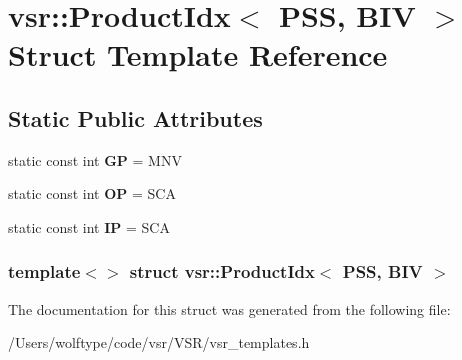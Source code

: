 \hypertarget{structvsr_1_1_product_idx_3_01_p_s_s_00_01_b_i_v_01_4}{\section{vsr\-:\-:Product\-Idx$<$ P\-S\-S, B\-I\-V $>$ Struct Template Reference}
\label{structvsr_1_1_product_idx_3_01_p_s_s_00_01_b_i_v_01_4}
}
\subsection*{Static Public Attributes}
\begin{DoxyCompactItemize}
\item 
\hypertarget{structvsr_1_1_product_idx_3_01_p_s_s_00_01_b_i_v_01_4_a77a0aca22c01c6dbe3514587b70cdd86}{static const int {\bfseries G\-P} = M\-N\-V}\label{structvsr_1_1_product_idx_3_01_p_s_s_00_01_b_i_v_01_4_a77a0aca22c01c6dbe3514587b70cdd86}

\item 
\hypertarget{structvsr_1_1_product_idx_3_01_p_s_s_00_01_b_i_v_01_4_a82cf21270ec0d18e4947c6366a3e0d1e}{static const int {\bfseries O\-P} = S\-C\-A}\label{structvsr_1_1_product_idx_3_01_p_s_s_00_01_b_i_v_01_4_a82cf21270ec0d18e4947c6366a3e0d1e}

\item 
\hypertarget{structvsr_1_1_product_idx_3_01_p_s_s_00_01_b_i_v_01_4_a86f6d55646073d437173d5deec8e667f}{static const int {\bfseries I\-P} = S\-C\-A}\label{structvsr_1_1_product_idx_3_01_p_s_s_00_01_b_i_v_01_4_a86f6d55646073d437173d5deec8e667f}

\end{DoxyCompactItemize}
\subsubsection*{template$<$$>$ struct vsr\-::\-Product\-Idx$<$ P\-S\-S, B\-I\-V $>$}



The documentation for this struct was generated from the following file\-:\begin{DoxyCompactItemize}
\item 
/\-Users/wolftype/code/vsr/\-V\-S\-R/vsr\-\_\-templates.\-h\end{DoxyCompactItemize}
